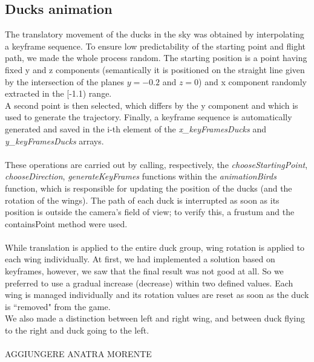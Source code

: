 \documentclass[12pt,a4paper]{article}
\begin{document}
	\subsection{Ducks animation}
	The translatory movement of the ducks in the sky was obtained by interpolating a keyframe sequence. To ensure low predictability of the starting point and flight path, we made the whole process random.
	The starting position is a point having fixed y and z components (semantically it is positioned on the straight line given by the intersection of the planes $y=-0.2$ and $z=0	$) and x component randomly extracted in the [-1.1) range.\\
	A second point is then selected, which differs by the y component and which is used to generate the trajectory. Finally, a keyframe sequence is automatically generated and saved in the i-th element of the \textit{x\_keyFramesDucks} and \textit{y\_keyFramesDucks} arrays.\\\\
	These operations are carried out by calling, respectively, the \textit{chooseStartingPoint}, \textit{chooseDirection}, \textit{generateKeyFrames} functions within the \textit{animationBirds} function, which is responsible for updating the position of the ducks (and the rotation of the wings). The path of each duck is interrupted as soon as its position is outside the camera's field of view; to verify this, a frustum and the containsPoint method were used.\\\\
	While translation is applied to the entire duck group, wing rotation is applied to each wing individually. At first, we had implemented a solution based on keyframes, however, we saw that the final result was not good at all.
	So we preferred to use a gradual increase (decrease) within two defined values. Each wing is managed individually and its rotation values are reset as soon as the duck is ``removed" from the game.\\
	We also made a distinction between left and right wing, and between duck flying to the right and duck going to the left.\\\\
	
	AGGIUNGERE ANATRA MORENTE
	
\end{document}
